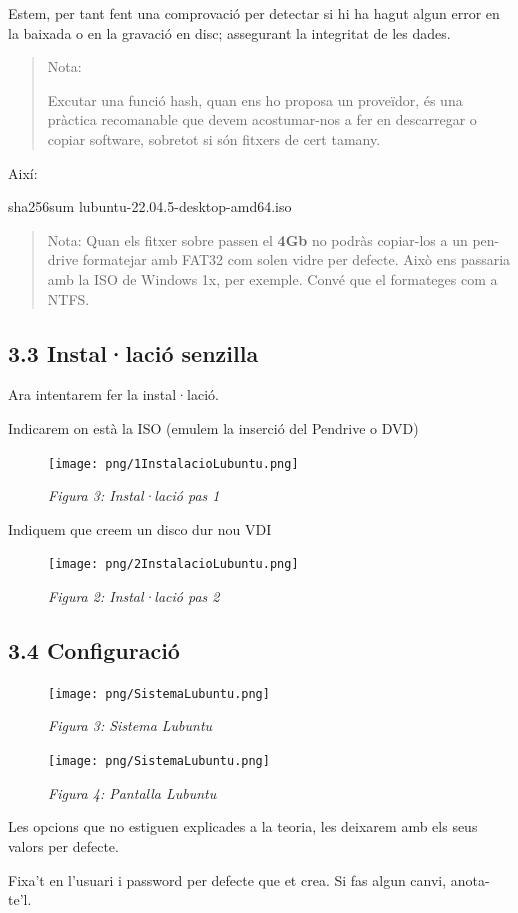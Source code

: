 \documentclass[
  12 pt,
  a4paper,
]{article}
\newenvironment{Shaded}{\begin{snugshade}}{\end{snugshade}}
\newcommand{\NormalTok}[1]{#1}
\begin{document}
Estem, per tant fent una comprovació per detectar si hi ha hagut algun
error en la baixada o en la gravació en disc; assegurant la integritat
de les dades.

\begin{quote}
Nota:

Excutar una funció hash, quan ens ho proposa un proveïdor, és una
pràctica recomanable que devem acostumar-nos a fer en descarregar o
copiar software, sobretot si són fitxers de cert tamany.
\end{quote}

Així:

\begin{Shaded}
\begin{Highlighting}[]
\NormalTok{sha256sum lubuntu{-}22.04.5{-}desktop{-}amd64.iso }
\end{Highlighting}
\end{Shaded}

\begin{quote}
Nota: Quan els fitxer sobre passen el \textbf{4Gb} no podràs copiar-los
a un pen-drive formatejar amb FAT32 com solen vidre per defecte. Això
ens passaria amb la ISO de Windows 1x, per exemple. Convé que el
formateges com a NTFS.
\end{quote}

\subsection{3.3 Instal·lació senzilla}\label{installaciuxf3-senzilla}

Ara intentarem fer la instal·lació.

Indicarem on està la ISO (emulem la inserció del Pendrive o DVD)

\begin{figure}
\centering
\texttt{[image: png/1InstalacioLubuntu.png]}
\caption{\emph{Figura 3: Instal·lació pas 1}}
\end{figure}

Indiquem que creem un disco dur nou VDI

\begin{figure}
\centering
\texttt{[image: png/2InstalacioLubuntu.png]}
\caption{\emph{Figura 2: Instal·lació pas 2}}
\end{figure}

\subsection{3.4 Configuració}\label{configuraciuxf3}

\begin{figure}
\centering
\texttt{[image: png/SistemaLubuntu.png]}
\caption{\emph{Figura 3: Sistema Lubuntu}}
\end{figure}

\begin{figure}
\centering
\texttt{[image: png/SistemaLubuntu.png]}
\caption{\emph{Figura 4: Pantalla Lubuntu}}
\end{figure}

Les opcions que no estiguen explicades a la teoria, les deixarem amb els
seus valors per defecte.

Fixa't en l'usuari i password per defecte que et crea. Si fas algun
canvi, anota-te'l.
\end{document}

